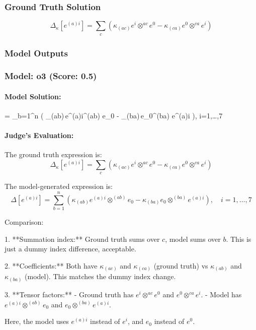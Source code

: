 \documentclass[10pt]{article}
\begin{document}
\subsubsection*{Ground Truth Solution}
\[ \boxed{\Delta_\kappa[e^{(a)i}] = \sum_c  (\kappa_{(ac)} e^i\otimes^{ac}  e^0 - \kappa_{(ca)}e^0\otimes^{ca} e^i )} \]

\subsubsection*{Model Outputs}
\subsubsection*{Model: o3 (Score: 0.5)}
\paragraph*{Model Solution:}
\;
\Delta \!\left[e^{(a)i}\right]\;=\;
\sum_{b=1}^{n}
\Bigl(
      \kappa_{(ab)}\,e^{(a)i}\otimes^{(ab)} e_{0}\;
      -\;
      \kappa_{(ba)}\,e_{0}\otimes^{(ba)} e^{(a)i}
\Bigr),
\qquad i=1,\ldots ,7\;

\paragraph*{Judge's Evaluation:}

The ground truth expression is:
\[
\Delta_\kappa[e^{(a)i}] = \sum_c \left( \kappa_{(ac)} e^i \otimes^{ac} e^0 - \kappa_{(ca)} e^0 \otimes^{ca} e^i \right)
\]

The model-generated expression is:
\[
\Delta \left[e^{(a)i}\right] = \sum_{b=1}^n \left( \kappa_{(ab)} e^{(a)i} \otimes^{(ab)} e_0 - \kappa_{(ba)} e_0 \otimes^{(ba)} e^{(a)i} \right), \quad i=1,\ldots,7
\]

Comparison:

1. **Summation index:** Ground truth sums over \( c \), model sums over \( b \). This is just a dummy index difference, acceptable.

2. **Coefficients:** Both have \(\kappa_{(ac)}\) and \(\kappa_{(ca)}\) (ground truth) vs \(\kappa_{(ab)}\) and \(\kappa_{(ba)}\) (model). This matches the dummy index change.

3. **Tensor factors:**
   - Ground truth has \( e^i \otimes^{ac} e^0 \) and \( e^0 \otimes^{ca} e^i \).
   - Model has \( e^{(a)i} \otimes^{(ab)} e_0 \) and \( e_0 \otimes^{(ba)} e^{(a)i} \).

   Here, the model uses \( e^{(a)i} \) instead of \( e^i \), and \( e_0 \) instead of \( e^0 \).
\end{document}
